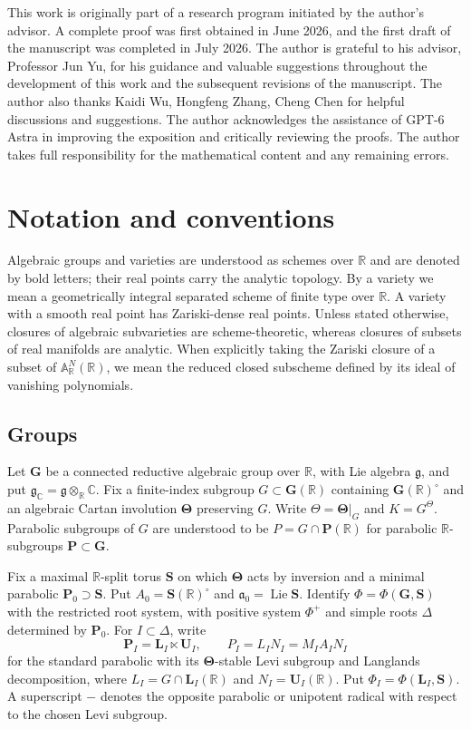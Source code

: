 \documentclass[a4paper,12pt]{amsart}
\numberwithin{equation}{section}
\theoremstyle{definition}
\theoremstyle{remark}
\newcommand{\G}{\mathbf G}
\newcommand{\pP}{\mathbf P}
\newcommand{\lL}{\mathbf L}
\newcommand{\U}{\mathbf U}
\newcommand{\R}{\mathbb R}
\newcommand{\C}{\mathbb C}
\newcommand{\fg}{\mathfrak g}
\newcommand{\fa}{\mathfrak a}
\newcommand{\Lie}{\operatorname{Lie}}
\newcommand{\tTheta}{\boldsymbol\Theta}
\newcommand{\sS}{\mathbf S}
\begin{document}
This work is originally part of a research program initiated by the author's advisor. A complete proof was first obtained in June 2026, and the first draft of the manuscript was completed in July 2026.
The author is grateful to his advisor, Professor Jun Yu, for his guidance and valuable suggestions throughout the development of this work and the subsequent revisions of the manuscript. The author also thanks Kaidi Wu, Hongfeng Zhang, Cheng Chen for helpful discussions and suggestions.
The author acknowledges the assistance of GPT-6 Astra in improving the exposition and critically reviewing the proofs. The author takes full responsibility for the mathematical content and any remaining errors.


\section{Notation and conventions}\label{sec:conventions}

Algebraic groups and varieties are understood as schemes over $\R$ and are denoted by bold letters; their real points carry the analytic topology. By a variety we mean a geometrically integral separated scheme of finite type over $\R$. A variety with a smooth real point has Zariski-dense real points. Unless stated otherwise, closures of algebraic subvarieties are scheme-theoretic, whereas closures of subsets of real manifolds are analytic. When explicitly taking the Zariski closure of a subset of $\mathbb A^N_\R(\R)$, we mean the reduced closed subscheme defined by its ideal of vanishing polynomials.

\subsection{Groups}\label{ssec:groups}

Let $\G$ be a connected reductive algebraic group over $\R$, with Lie algebra $\fg$, and put $\fg_\C=\fg\otimes_\R\C$. Fix a finite-index subgroup $G\subset\G(\R)$ containing $\G(\R)^\circ$ and an algebraic Cartan involution $\tTheta$ preserving $G$. Write $\Theta=\tTheta|_G$ and $K=G^\Theta$. Parabolic subgroups of $G$ are understood to be $P=G\cap\pP(\R)$ for parabolic $\R$-subgroups $\pP\subset\G$.

Fix a maximal $\R$-split torus $\sS$ on which $\tTheta$ acts by inversion and a minimal parabolic $\pP_0\supset\sS$. Put $A_0=\sS(\R)^\circ$ and $\fa_0=\Lie\sS$. Identify $\Phi=\Phi(\G,\sS)$ with the restricted root system, with positive system $\Phi^+$ and simple roots $\Delta$ determined by $\pP_0$. For $I\subset\Delta$, write
\[
 \pP_I=\lL_I\ltimes\U_I,\qquad P_I=L_IN_I=M_IA_IN_I
\]
for the standard parabolic with its $\tTheta$-stable Levi subgroup and Langlands decomposition, where $L_I=G\cap\lL_I(\R)$ and $N_I=\U_I(\R)$. Put $\Phi_I=\Phi(\lL_I,\sS)$. A superscript $-$ denotes the opposite parabolic or unipotent radical with respect to the chosen Levi subgroup.
\end{document}
